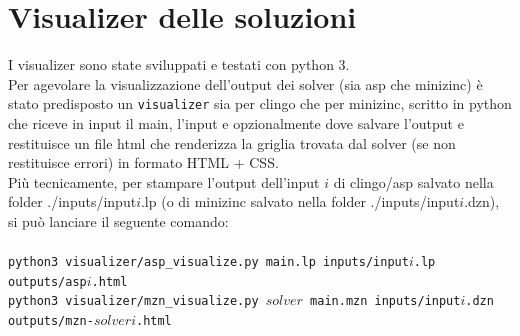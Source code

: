 \documentclass{article}
\begin{document}
\section{Visualizer delle soluzioni}
I visualizer sono state sviluppati e testati con python 3.\\
Per agevolare la visualizzazione dell'output dei solver (sia asp che minizinc) è stato predisposto un \texttt{visualizer} sia per clingo che per minizinc, scritto in python che riceve in input il main, l'input e opzionalmente dove salvare l'output e restituisce un file html che renderizza la griglia trovata dal solver (se non restituisce errori) in formato HTML + CSS.\\
Più tecnicamente, per stampare l'output dell'input $i$ di clingo/asp salvato nella folder ./inputs/input$i$.lp (o di minizinc salvato nella folder ./inputs/input$i$.dzn), si può lanciare il seguente comando:\\\\
\hspace*{.5cm}\texttt{python3 visualizer/asp\_visualize.py main.lp inputs/input$i$.lp outputs/asp$i$.html}\\
\hspace*{.5cm}\texttt{python3 visualizer/mzn\_visualize.py $solver$ main.mzn inputs/input$i$.dzn outputs/mzn-$solver$$i$.html}\\\\
\end{document}
